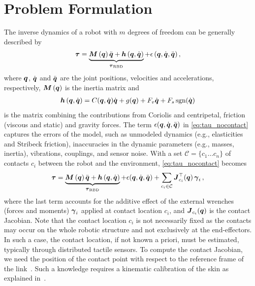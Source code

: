 
\section{Problem Formulation}\label{sec:problem}

The inverse dynamics of a robot with $m$ degrees of freedom can be generally
described by 
\begin{align}
	\boldsymbol{\tau} = \underbrace{\boldsymbol M \left( \boldsymbol q \right)\ddot{\boldsymbol q} + \boldsymbol{h} \left(\boldsymbol q,\dot{\boldsymbol q} \right)}_{\boldsymbol{\tau}_\text{RBD}} + \epsilon\,(\boldsymbol q,\dot{\boldsymbol q},\ddot{\boldsymbol q}) \,,
	\label{eq:tau_nocontact}
\end{align}
where $\boldsymbol q$, $\dot{\boldsymbol q}$ and $\ddot{\boldsymbol q}$ are  the joint positions, velocities and
accelerations, respectively, $\boldsymbol M \left( \boldsymbol q \right)$ is the inertia matrix and 
\begin{align*}
	\Hmatrix = C(\q,\dq)\dq + g(\q) + F_v \dq + F_s \,\text{sgn}(\dq) %
\end{align*}
is the matrix combining the contributions from Coriolis and centripetal,
friction (viscous and static) and gravity forces. The term
$\epsilon(\boldsymbol q,\dot{\boldsymbol q},\ddot{\boldsymbol q})$ in \eq\eqref{eq:tau_nocontact} captures the errors of
the model, such as unmodeled dynamics (e.g., elasticities and Stribeck
friction), inaccuracies in the dynamic parameters (e.g., masses, inertia),
vibrations, couplings, and sensor noise. With a set $\mathcal{C}=\{c_1 \ldots
c_n\}$ of contacts $c_i$ between the robot and the environment,
\eq\eqref{eq:tau_nocontact} becomes
\begin{align}
	\boldsymbol{\tau} = \underbrace{\boldsymbol M \left( \boldsymbol q \right)\ddot{\boldsymbol q} + \boldsymbol{h} \left(\boldsymbol q,\dot{\boldsymbol q} \right)}_{\boldsymbol{\tau}_\text{RBD}} + \epsilon(\boldsymbol q,\dot{\boldsymbol q},\ddot{\boldsymbol q}) + \sum_{c_i \in\mathcal{C}} {\boldsymbol J^\top_{c_i}(\boldsymbol q)}\, \boldsymbol{\gamma}_i \, ,
	\label{eq:tau_contact}
\end{align}
where the last term accounts for the additive effect of the external wrenches
(forces and moments) $\boldsymbol{\gamma}_i$ applied at contact location $c_i$, and
$\boldsymbol J_{c_i}(\boldsymbol q)$  is the contact Jacobian. Note that the contact location
$c_i$ is not necessarily fixed as the contacts may occur on the whole robotic
structure and not exclusively at the end-effectors. In such a case, the contact
location, if not known a priori, must be estimated, typically through
distributed tactile sensors. To compute the contact Jacobian, we need the
position of the contact point with respect to the reference frame of the
link~\cite{Fumagalli2012}. Such a knowledge requires a kinematic calibration of
the skin as explained in~\cite{DelPrete2011}.


